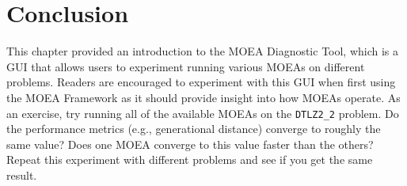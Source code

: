 \section{Conclusion}
This chapter provided an introduction to the MOEA Diagnostic Tool, which is a GUI that allows users to experiment running various MOEAs on different problems.  Readers are encouraged to experiment with this GUI when first using the MOEA Framework as it should provide insight into how MOEAs operate.  As an exercise, try running all of the available MOEAs on the \texttt{DTLZ2\_2} problem.  Do the performance metrics (e.g., generational distance) converge to roughly the same value?  Does one MOEA converge to this value faster than the others?  Repeat this experiment with different problems and see if you get the same result.